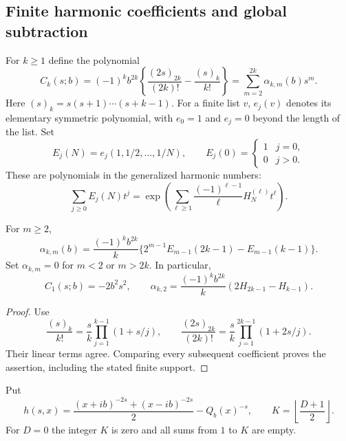 \subsection{Finite harmonic coefficients and global subtraction}

For $k\ge1$ define the polynomial
\begin{equation}\label{sd:eq:Ck}
 C_k(s;b)=(-1)^kb^{2k}
 \left\{\frac{(2s)_{2k}}{(2k)!}-\frac{(s)_k}{k!}\right\}
 =\sum_{m=2}^{2k}\alpha_{k,m}(b)s^m.
\end{equation}
Here $(s)_k=s(s+1)\cdots(s+k-1)$.  For a finite list $v$,
$e_j(v)$ denotes its elementary symmetric polynomial, with $e_0=1$
and $e_j=0$ beyond the length of the list.  Set
\begin{equation}\label{sd:eq:elementary}
 E_j(N)=e_j(1,1/2,\ldots,1/N),\qquad E_j(0)=\begin{cases}1&j=0,\\0&j>0.\end{cases}
\end{equation}
These are polynomials in the generalized harmonic numbers:
\[
 \sum_{j\ge0}E_j(N)t^j
 =\exp\left(\sum_{\ell\ge1}
       \frac{(-1)^{\ell-1}}{\ell}H_N^{(\ell)}t^\ell\right).
\]

\begin{lemma}\label{sd:lem:coefficients}
For $m\ge2$,
\begin{equation}\label{sd:eq:alpha}
 \alpha_{k,m}(b)=\frac{(-1)^kb^{2k}}{k}
       \{2^{m-1}E_{m-1}(2k-1)-E_{m-1}(k-1)\}.
\end{equation}
Set $\alpha_{k,m}=0$ for $m<2$ or $m>2k$.  In particular,
\[
 C_1(s;b)=-2b^2s^2,\qquad
 \alpha_{k,2}=\frac{(-1)^kb^{2k}}k
                    (2H_{2k-1}-H_{k-1}).
\]
\end{lemma}
\begin{proof}
Use
\[
 \frac{(s)_k}{k!}=\frac{s}{k}
                    \prod_{j=1}^{k-1}(1+s/j),\qquad
 \frac{(2s)_{2k}}{(2k)!}=\frac{s}{k}
                    \prod_{j=1}^{2k-1}(1+2s/j).
\]
Their linear terms agree.  Comparing every subsequent coefficient
proves the assertion, including the stated finite support.
\end{proof}

Put
\begin{equation}\label{sd:eq:h}
 h(s,x)=\frac{(x+ib)^{-2s}+(x-ib)^{-2s}}2-Q_b(x)^{-s},
 \qquad K=\left\lfloor\frac{D+1}{2}\right\rfloor.
\end{equation}
For $D=0$ the integer $K$ is zero and all sums from $1$ to $K$ are empty.

